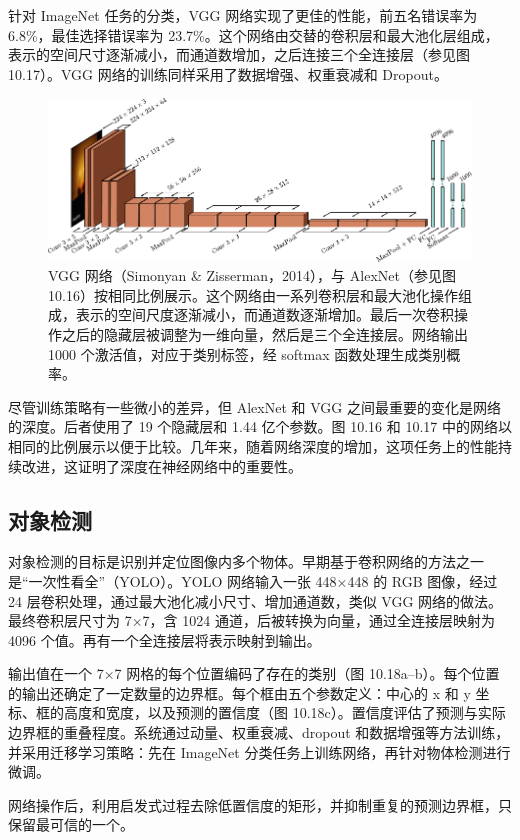 \documentclass[lang=cn,newtx,10pt,scheme=chinese]{elegantbook}
\begin{document}
针对 ImageNet 任务的分类，VGG 网络实现了更佳的性能，前五名错误率为 6.8\%，最佳选择错误率为 23.7\%。这个网络由交替的卷积层和最大池化层组成，表示的空间尺寸逐渐减小，而通道数增加，之后连接三个全连接层（参见图 10.17）。VGG 网络的训练同样采用了数据增强、权重衰减和 Dropout。


\begin{figure}[ht!]
	\centering
	\includegraphics[width=0.7\linewidth]{PDFFigures/UDLChap10PDF/ConvVGG.pdf}
	\caption{VGG 网络（Simonyan \& Zisserman，2014），与 AlexNet（参见图 10.16）按相同比例展示。这个网络由一系列卷积层和最大池化操作组成，表示的空间尺度逐渐减小，而通道数逐渐增加。最后一次卷积操作之后的隐藏层被调整为一维向量，然后是三个全连接层。网络输出 1000 个激活值，对应于类别标签，经 softmax 函数处理生成类别概率。}
\end{figure}


尽管训练策略有一些微小的差异，但 AlexNet 和 VGG 之间最重要的变化是网络的深度。后者使用了 19 个隐藏层和 1.44 亿个参数。图 10.16 和 10.17 中的网络以相同的比例展示以便于比较。几年来，随着网络深度的增加，这项任务上的性能持续改进，这证明了深度在神经网络中的重要性。

\subsection{对象检测}
对象检测的目标是识别并定位图像内多个物体。早期基于卷积网络的方法之一是“一次性看全”（YOLO）。YOLO 网络输入一张 448×448 的 RGB 图像，经过 24 层卷积处理，通过最大池化减小尺寸、增加通道数，类似 VGG 网络的做法。最终卷积层尺寸为 7×7，含 1024 通道，后被转换为向量，通过全连接层映射为 4096 个值。再有一个全连接层将表示映射到输出。

输出值在一个 7×7 网格的每个位置编码了存在的类别（图 10.18a–b）。每个位置的输出还确定了一定数量的边界框。每个框由五个参数定义：中心的 x 和 y 坐标、框的高度和宽度，以及预测的置信度（图 10.18c）。置信度评估了预测与实际边界框的重叠程度。系统通过动量、权重衰减、dropout 和数据增强等方法训练，并采用迁移学习策略：先在 ImageNet 分类任务上训练网络，再针对物体检测进行微调。

网络操作后，利用启发式过程去除低置信度的矩形，并抑制重复的预测边界框，只保留最可信的一个。
\end{document}
